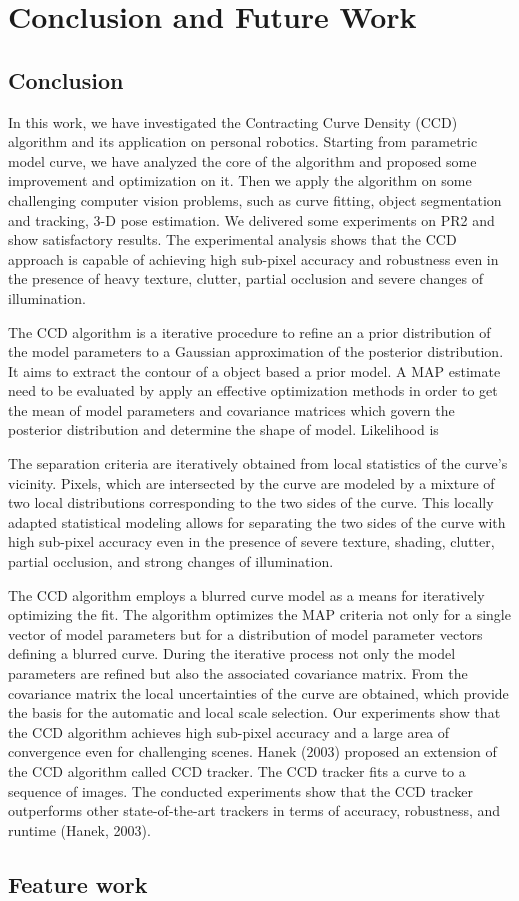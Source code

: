 
\chapter{Conclusion and  Future Work}
\label{chapter:conclusion}

\section{Conclusion}
\label{sec:con}

In this work, we have investigated the Contracting Curve Density (CCD)
algorithm and its application on personal robotics. Starting from
parametric model curve, we have analyzed the core of the algorithm and
proposed some improvement and optimization on it. Then we apply the
algorithm on some challenging computer vision problems, such as curve
fitting, object segmentation and tracking, 3-D pose estimation.  We
delivered some experiments on PR2 and show satisfactory results. The
experimental analysis shows that the CCD approach is capable of
achieving high sub-pixel accuracy and robustness even in the presence
of heavy texture, clutter, partial occlusion and severe changes of
illumination.

The CCD algorithm is a iterative procedure to refine an
a prior distribution of the model parameters to a Gaussian
approximation of the posterior distribution. It aims to extract the
contour of a object based a prior model. A MAP estimate need to be
evaluated by apply an effective optimization methods in order to get
the mean of model parameters and covariance matrices which govern the
posterior distribution and determine the shape of model. Likelihood is 

The separation criteria are iteratively
obtained from local statistics of the curve's vicinity. Pixels, which
are intersected by the curve are modeled by a mixture of two local
distributions corresponding to the two sides of the curve. This
locally adapted statistical modeling allows for separating the two
sides of the curve with high sub-pixel accuracy even in the presence
of severe texture, shading, clutter, partial occlusion, and strong
changes of illumination.


The CCD algorithm employs a blurred curve model as a means for
iteratively optimizing the fit. The algorithm optimizes the MAP
criteria not only for a single vector of model parameters but for a
distribution of model parameter vectors defining a blurred
curve. During the iterative process not only the model parameters are
refined but also the associated covariance matrix. From the covariance
matrix the local uncertainties of the curve are obtained, which
provide the basis for the automatic and local scale selection. Our
experiments show that the CCD algorithm achieves high sub-pixel
accuracy and a large area of convergence even for challenging
scenes. Hanek (2003) proposed an extension of the CCD algorithm called
CCD tracker. The CCD tracker fits a curve to a sequence of images. The
conducted experiments show that the CCD tracker outperforms other
state-of-the-art trackers in terms of accuracy, robustness, and
runtime (Hanek, 2003).

\section{Feature work}
\label{sec:feature}

